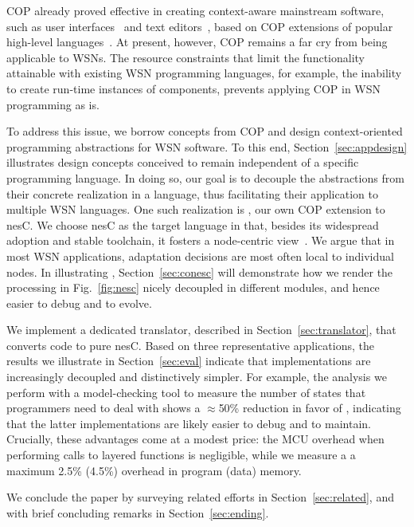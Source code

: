 COP already proved effective in creating context-aware mainstream
software, such as user interfaces~\cite{Keays03} and text
editors~\cite{Kamina11}, based on COP extensions of popular high-level
languages~\cite{Salvaneschi12}. At present, however, COP remains a far
cry from being applicable to WSNs. The resource constraints
that limit the functionality attainable with existing WSN programming
languages, for example, the inability to create run-time instances of
components, prevents applying COP in WSN programming as is.

To address this issue, we borrow concepts from COP and design
context-oriented programming abstractions for WSN software. To this
end, Section~\ref{sec:appdesign} illustrates design concepts conceived
to remain independent of a specific programming language. In doing so,
our goal is to decouple the abstractions from their concrete
realization in a language, thus facilitating their application to
multiple WSN languages. One such realization is \conesc, our own COP
extension to nesC. We choose nesC as the target language in that,
besides its widespread adoption and stable toolchain, it fosters a
node-centric view~\cite{mottola10:survey}. We argue that in most WSN
applications, adaptation decisions are most often local to individual
nodes. In illustrating \conesc, Section~\ref{sec:conesc} will
demonstrate how we render the processing in Fig.~\ref{fig:nesc} nicely
decoupled in different modules, and hence easier to debug and to
evolve.

We implement a dedicated translator, described in
Section~\ref{sec:translator}, that converts \conesc code to pure nesC.
Based on three representative applications, the results we illustrate
in Section~\ref{sec:eval} indicate that \conesc implementations are
increasingly decoupled and distinctively simpler. For example, the
analysis we perform with a model-checking tool to measure the number
of states that programmers need to deal with shows a $\approx$50\%
reduction in favor of \conesc, indicating that the latter
implementations are likely easier to debug and to maintain. Crucially,
these advantages come at a modest price: the MCU overhead when
performing calls to layered functions is negligible, while we measure
a a maximum 2.5\% (4.5\%) overhead in program (data) memory.

We conclude the paper by surveying related efforts in
Section~\ref{sec:related}, and with brief concluding remarks in
Section~\ref{sec:ending}.



